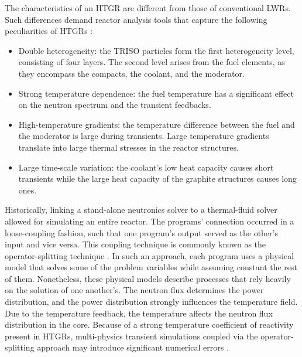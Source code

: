 The characteristics of an \gls{HTGR} are different from those of conventional \glspl{LWR}.
Such differences demand reactor analysis tools that capture the following peculiarities of \glspl{HTGR} \cite{rohde_development_2012}\cite{bostelmann_criticality_2016}:
\begin{itemize}
\item Double heterogeneity: the TRISO particles form the first heterogeneity level, consisting of four
layers.
The second level arises from the fuel elements, as they encompass the compacts, the coolant, and the moderator.
\item Strong temperature dependence: the fuel temperature has a significant effect on the neutron spectrum and the transient feedbacks.
\item High-temperature gradients: the temperature difference between the fuel and the moderator is large during transients.
Large temperature gradients translate into large thermal stresses in the reactor structures.
\item Large time-scale variation: the coolant's low heat capacity causes short transients while the large heat capacity of the graphite structures causes long ones.
\end{itemize}

Historically, linking a stand-alone neutronics solver to a thermal-fluid solver allowed for simulating an entire reactor.
The programs' connection occurred in a loose-coupling fashion, such that one program's output served as the other's input and vice versa.
This coupling technique is commonly known as the operator-splitting technique \cite{ragusa_consistent_2009}.
In such an approach, each program uses a physical model that solves some of the problem variables while assuming constant the rest of them.
Nonetheless, these physical models describe processes that rely heavily on the solution of one another's.
The neutron flux determines the power distribution, and the power distribution strongly influences the temperature field.
Due to the temperature feedback, the temperature affects the neutron flux distribution in the core.
Because of a strong temperature coefficient of reactivity present in HTGRs, multi-physics transient simulations coupled via the operator-splitting approach may introduce significant numerical errors \cite{park_tightly_2010}\cite{ragusa_consistent_2009}.

